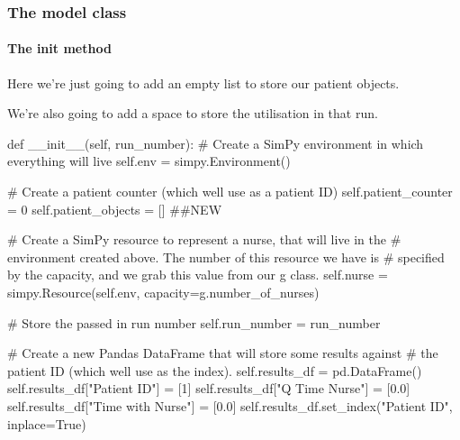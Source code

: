 \documentclass[
  letterpaper,
  DIV=11,
  numbers=noendperiod]{scrreprt}
\let\oldparagraph\paragraph
\renewcommand{\paragraph}[1]{\oldparagraph{#1}\mbox{}}
\newenvironment{Shaded}{}{}
\newcommand{\CommentTok}[1]{\textcolor[rgb]{0.42,0.45,0.49}{#1}}
\newcommand{\DecValTok}[1]{\textcolor[rgb]{0.00,0.36,0.77}{#1}}
\newcommand{\FloatTok}[1]{\textcolor[rgb]{0.00,0.36,0.77}{#1}}
\newcommand{\FunctionTok}[1]{\textcolor[rgb]{0.44,0.26,0.76}{#1}}
\newcommand{\KeywordTok}[1]{\textcolor[rgb]{0.84,0.23,0.29}{#1}}
\newcommand{\NormalTok}[1]{\textcolor[rgb]{0.14,0.16,0.18}{#1}}
\newcommand{\OperatorTok}[1]{\textcolor[rgb]{0.14,0.16,0.18}{#1}}
\newcommand{\StringTok}[1]{\textcolor[rgb]{0.01,0.18,0.38}{#1}}
\newcommand{\VariableTok}[1]{\textcolor[rgb]{0.89,0.38,0.04}{#1}}
\begin{document}
\subsubsection{The model class}\label{the-model-class-7}

\paragraph{\texorpdfstring{The \textbf{init}
method}{The init method}}\label{the-init-method-6}

Here we're just going to add an empty list to store our patient objects.

We're also going to add a space to store the utilisation in that run.

\begin{Shaded}
\begin{Highlighting}[]
    \KeywordTok{def} \FunctionTok{\_\_init\_\_}\NormalTok{(}\VariableTok{self}\NormalTok{, run\_number):}
        \CommentTok{\# Create a SimPy environment in which everything will live}
        \VariableTok{self}\NormalTok{.env }\OperatorTok{=}\NormalTok{ simpy.Environment()}

        \CommentTok{\# Create a patient counter (which we\textquotesingle{}ll use as a patient ID)}
        \VariableTok{self}\NormalTok{.patient\_counter }\OperatorTok{=} \DecValTok{0}
        \VariableTok{self}\NormalTok{.patient\_objects }\OperatorTok{=}\NormalTok{ [] }\CommentTok{\#\#NEW}

        \CommentTok{\# Create a SimPy resource to represent a nurse, that will live in the}
        \CommentTok{\# environment created above.  The number of this resource we have is}
        \CommentTok{\# specified by the capacity, and we grab this value from our g class.}
        \VariableTok{self}\NormalTok{.nurse }\OperatorTok{=}\NormalTok{ simpy.Resource(}\VariableTok{self}\NormalTok{.env, capacity}\OperatorTok{=}\NormalTok{g.number\_of\_nurses)}

        \CommentTok{\# Store the passed in run number}
        \VariableTok{self}\NormalTok{.run\_number }\OperatorTok{=}\NormalTok{ run\_number}

        \CommentTok{\# Create a new Pandas DataFrame that will store some results against}
        \CommentTok{\# the patient ID (which we\textquotesingle{}ll use as the index).}
        \VariableTok{self}\NormalTok{.results\_df }\OperatorTok{=}\NormalTok{ pd.DataFrame()}
        \VariableTok{self}\NormalTok{.results\_df[}\StringTok{"Patient ID"}\NormalTok{] }\OperatorTok{=}\NormalTok{ [}\DecValTok{1}\NormalTok{]}
        \VariableTok{self}\NormalTok{.results\_df[}\StringTok{"Q Time Nurse"}\NormalTok{] }\OperatorTok{=}\NormalTok{ [}\FloatTok{0.0}\NormalTok{]}
        \VariableTok{self}\NormalTok{.results\_df[}\StringTok{"Time with Nurse"}\NormalTok{] }\OperatorTok{=}\NormalTok{ [}\FloatTok{0.0}\NormalTok{]}
        \VariableTok{self}\NormalTok{.results\_df.set\_index(}\StringTok{"Patient ID"}\NormalTok{, inplace}\OperatorTok{=}\VariableTok{True}\NormalTok{)}


\end{Highlighting}
\end{Shaded}
\end{document}
